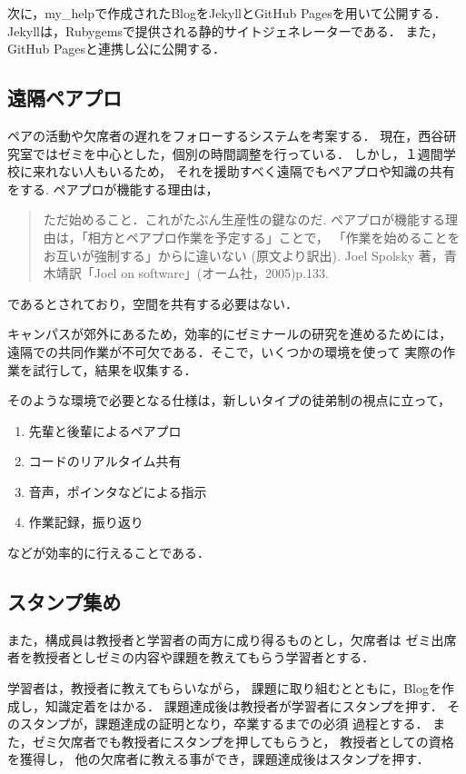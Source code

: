 \documentclass[a4,p11]{article}
\begin{document}
次に，my\_helpで作成されたBlogをJekyllとGitHub Pagesを用いて公開する．
Jekyllは，Rubygemsで提供される静的サイトジェネレーターである．
また，GitHub Pagesと連携し公に公開する．

\subsection{遠隔ペアプロ}
\label{sec:org83edeba}
ペアの活動や欠席者の遅れをフォローするシステムを考案する．
現在，西谷研究室ではゼミを中心とした，個別の時間調整を行っている．
しかし，１週間学校に来れない人もいるため，
それを援助すべく遠隔でもペアプロや知識の共有をする.
ペアプロが機能する理由は，
\begin{quote}
ただ始めること．これがたぶん生産性の鍵なのだ.
ペアプロが機能する理由は，「相方とペアプロ作業を予定する」ことで，
「作業を始めることをお互いが強制する」からに違いない
(原文より訳出).
Joel Spolsky 著，青木靖訳「Joel on software」(オーム社，2005)p.133.
\end{quote}
であるとされており，空間を共有する必要はない．

キャンパスが郊外にあるため，効率的にゼミナールの研究を進めるためには，
遠隔での共同作業が不可欠である．そこで，いくつかの環境を使って
実際の作業を試行して，結果を収集する．

そのような環境で必要となる仕様は，新しいタイプの徒弟制の視点に立って，
\begin{enumerate}
\item 先輩と後輩によるペアプロ
\item コードのリアルタイム共有
\item 音声，ポインタなどによる指示
\item 作業記録，振り返り
\end{enumerate}
などが効率的に行えることである．

\subsection{スタンプ集め}
\label{sec:orgd2ffb9c}
また，構成員は教授者と学習者の両方に成り得るものとし，欠席者は
ゼミ出席者を教授者としゼミの内容や課題を教えてもらう学習者とする．

学習者は，教授者に教えてもらいながら，
課題に取り組むとともに，Blogを作成し，知識定着をはかる．
課題達成後は教授者が学習者にスタンプを押す．
そのスタンプが，課題達成の証明となり，卒業するまでの必須
過程とする．
また，ゼミ欠席者でも教授者にスタンプを押してもらうと，
教授者としての資格を獲得し，
他の欠席者に教える事ができ，課題達成後はスタンプを押す．
\end{document}
